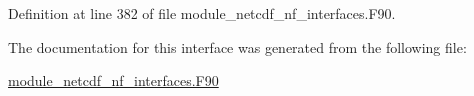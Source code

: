 Definition at line 382 of file module\+\_\+netcdf\+\_\+nf\+\_\+interfaces.\+F90.



The documentation for this interface was generated from the following file\+:\begin{DoxyCompactItemize}
\item 
\hyperlink{module__netcdf__nf__interfaces_8F90}{module\+\_\+netcdf\+\_\+nf\+\_\+interfaces.\+F90}\end{DoxyCompactItemize}
